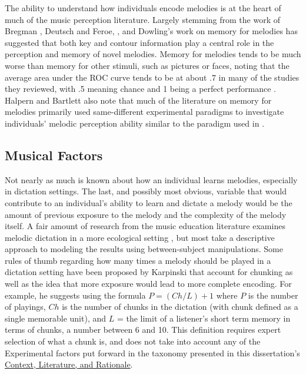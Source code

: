 \documentclass[12pt,]{book}
\begin{document}
The ability to understand how individuals encode melodies is at the heart of much of the music perception literature.
Largely stemming from the work of Bregman \citep{bregmanAuditorySceneAnalysis2006}, Deutsch and Feroe, \citep{deutschInternalRepresentationPitch1981}, and Dowling's \citep{bartlettRecognitionTransposedMelodies1980, dowlingExpectancyAttentionMelody1990, dowlingPerceptionInterleavedMelodies1973, dowlingScaleContourTwo1978} work on memory for melodies has suggested that both key and contour information play a central role in the perception and memory of novel melodies.
Memory for melodies tends to be much worse than memory for other stimuli, such as pictures or faces, noting that the average area under the ROC curve tends to be at about .7 in many of the studies they reviewed, with .5 meaning chance and 1 being a perfect performance \citep{halpernMemoryMelodies2010}.
Halpern and Bartlett also note that much of the literature on memory for melodies primarily used same-different experimental paradigms to investigate individuals' melodic perception ability similar to the paradigm used in \citep{halpernEffectsTimbreTempo2008}.

\hypertarget{musical-factors-1}{%
\subsection{Musical Factors}\label{musical-factors-1}}

Not nearly as much is known about how an individual learns melodies, especially in dictation settings.
The last, and possibly most obvious, variable that would contribute to an individual's ability to learn and dictate a melody would be the amount of previous exposure to the melody and the complexity of the melody itself.
A fair amount of research from the music education literature examines melodic dictation in a more ecological setting \citep{buonviriEffectsMusicNotation2015, buonviriEffectsPreparatorySinging2015, buonviriEffectsTwoListening2017, buonviriExplorationUndergraduateMusic2014, buonviriMelodicDictationInstruction2015, unsworthAutomatedVersionOperation2005}, but most take a descriptive approach to modeling the results using between-subject manipulations.
Some rules of thumb regarding how many times a melody should be played in a dictation setting have been proposed by Karpinski \citep[p.99]{karpinskiAuralSkillsAcquisition2000} that account for chunking as well as the idea that more exposure would lead to more complete encoding.
For example, he suggests using the formula \(P = (Ch/L) + 1\) where \(P\) is the number of playings, \(Ch\) is the number of chunks in the dictation (with chunk defined as a single memorable unit), and \(L\) = the limit of a listener's short term memory in terms of chunks, a number between 6 and 10.
This definition requires expert selection of what a chunk is, and does not take into account any of the Experimental factors put forward in the taxonomy presented in this dissertation's \protect\hyperlink{intro}{Context, Literature, and Rationale}.
\end{document}
